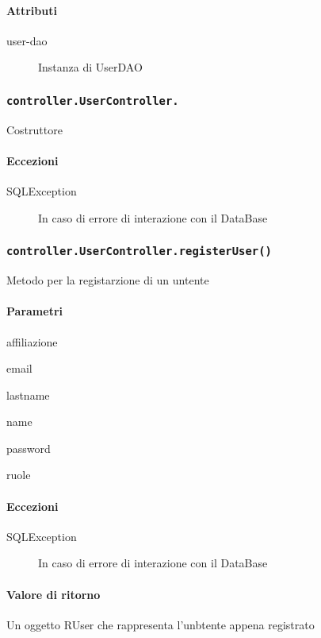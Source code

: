 \paragraph{Attributi}
\begin{description}
\item[user-dao] Instanza di UserDAO
\end{description}

\subsubsection{\texttt{controller.UserController.}}
Costruttore
\paragraph{Eccezioni}
\begin{description}
\item[SQLException] In caso di errore di interazione con il DataBase
\end{description}

\subsubsection{\texttt{controller.UserController.registerUser()}}
Metodo per la registarzione di un untente
\paragraph{Parametri}
\begin{description}
\item affiliazione
\item email
\item lastname
\item name
\item password
\item ruole
\end{description}
\paragraph{Eccezioni}
\begin{description}
\item[SQLException] In caso di errore di interazione con il DataBase
\end{description}
\paragraph{Valore di ritorno}
Un oggetto RUser che rappresenta l'unbtente appena registrato

